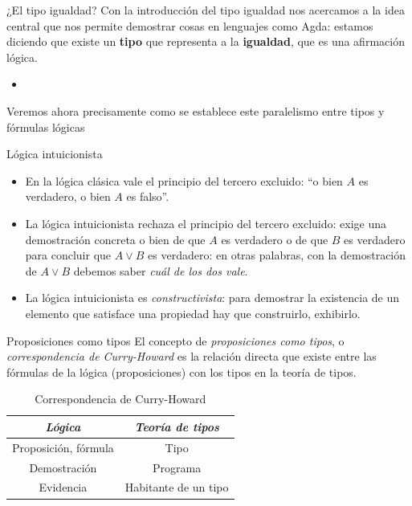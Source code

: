 \documentclass[11pt]{beamer}
\newcommand{\bit}{\begin{itemize}\setlength\itemsep{1em}}
\newcommand{\eit}{\end{itemize}}
\begin{document}
\begin{frame}{¿El tipo igualdad?}
 Con la introducción del tipo igualdad nos acercamos a la idea central que nos permite demostrar cosas en lenguajes como Agda: estamos diciendo que existe un \textbf{tipo} que representa a la \textbf{igualdad}, que es una afirmación lógica.
\bit
\item[]
\eit
Veremos ahora precisamente como se establece este paralelismo entre tipos y fórmulas lógicas

\end{frame}

\begin{frame}{Lógica intuicionista}
\bit
\item En la lógica clásica vale el principio del tercero excluido: ``o bien $A$ es verdadero, o bien $A$ es falso''.

\item La lógica intuicionista rechaza el principio del tercero excluido: exige una demostración concreta o bien de que $A$ es verdadero o de que $B$ es verdadero para concluir que $A \vee B$ es verdadero: en otras palabras, con la demostración de $A \vee B$ debemos saber \textit{cuál de los dos vale}.

\item La lógica intuicionista es \textit{constructivista}: para demostrar la existencia de un elemento que satisface una propiedad hay que construirlo, exhibirlo.
\eit

\end{frame}

\begin{frame}{Proposiciones como tipos}
El concepto de \textit{proposiciones como tipos}, o \textit{correspondencia de Curry-Howard} es la relación directa que existe entre las fórmulas de la lógica (proposiciones) con los tipos en la teoría de tipos. 

\begin{table}[ht]
    \centering
    \begin{tabular}{|c|c|}
    \hline
    \textit{\textbf{Lógica}} & \textit{\textbf{Teoría de tipos}} \\ \hline
    Proposición, fórmula     & Tipo                              \\ \hline
    Demostración             & Programa                          \\ \hline
    Evidencia                & Habitante de un tipo              \\ \hline
    \end{tabular}
    \caption{Correspondencia de Curry-Howard}
    \label{tab:cwi}
    \end{table}


\end{frame}
\end{document}
